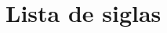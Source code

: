 \documentclass[12pt,twoside,brazilian]{book}
\begin{document}

\makeatletter
\if@openright\cleardoublepage\else\clearpage\fi
\makeatother


\newcommand\disablenewpage[1]{{\let\clearpage\par\let\cleardoublepage\par #1}}

\bgroup
\raggedbottom


\disablenewpage{\chapter*{Lista de siglas}}
\end{document}
